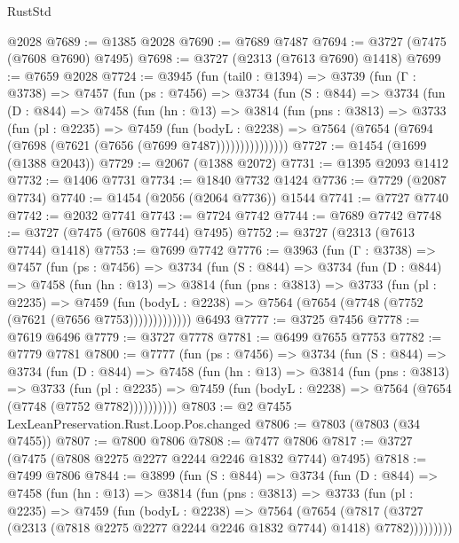 \begin{lexlean}{RustStd}
\begin{coremodule}
    @2028
@7689 := @1385 @2028
@7690 := @7689 @7487
@7694 := @3727 (@7475 (@7608 @7690) @7495)
@7698 := @3727 (@2313 (@7613 @7690) @1418)
@7699 := @7659 @2028
@7724 := @3945
    (fun (tail0 : @1394) =>
    @3739
      (fun (Γ : @3738) =>
      @7457
        (fun (ps : @7456) =>
        @3734
          (fun (S : @844) =>
          @3734
            (fun (D : @844) =>
            @7458
              (fun (hn : @13) =>
              @3814
                (fun (pns : @3813) =>
                @3733
                  (fun (pl : @2235) =>
                  @7459
                    (fun (bodyL : @2238) =>
                    @7564 (@7654 (@7694 (@7698 (@7621 (@7656 (@7699 @7487)))))))))))))))
@7727 := @1454 (@1699 (@1388 @2043))
@7729 := @2067 (@1388 @2072)
@7731 := @1395 @2093 @1412
@7732 := @1406 @7731
@7734 := @1840 @7732 @1424
@7736 := @7729 (@2087 @7734)
@7740 := @1454 (@2056 (@2064 @7736)) @1544
@7741 := @7727 @7740
@7742 := @2032 @7741
@7743 := @7724 @7742
@7744 := @7689 @7742
@7748 := @3727 (@7475 (@7608 @7744) @7495)
@7752 := @3727 (@2313 (@7613 @7744) @1418)
@7753 := @7699 @7742
@7776 := @3963
    (fun (Γ : @3738) =>
    @7457
      (fun (ps : @7456) =>
      @3734
        (fun (S : @844) =>
        @3734
          (fun (D : @844) =>
          @7458
            (fun (hn : @13) =>
            @3814
              (fun (pns : @3813) =>
              @3733
                (fun (pl : @2235) =>
                @7459
                  (fun (bodyL : @2238) =>
                  @7564 (@7654 (@7748 (@7752 (@7621 (@7656 @7753)))))))))))))
    @6493
@7777 := @3725 @7456
@7778 := @7619 @6496
@7779 := @3727 @7778
@7781 := @6499 @7655 @7753
@7782 := @7779 @7781
@7800 := @7777
    (fun (ps : @7456) =>
    @3734
      (fun (S : @844) =>
      @3734
        (fun (D : @844) =>
        @7458
          (fun (hn : @13) =>
          @3814
            (fun (pns : @3813) =>
            @3733
              (fun (pl : @2235) =>
              @7459 (fun (bodyL : @2238) => @7564 (@7654 (@7748 (@7752 @7782))))))))))
@7803 := @2 @7455 LexLeanPreservation.Rust.Loop.Pos.changed
@7806 := @7803 (@7803 (@34 @7455))
@7807 := @7800 @7806
@7808 := @7477 @7806
@7817 := @3727 (@7475 (@7808 @2275 @2277 @2244 @2246 @1832 @7744) @7495)
@7818 := @7499 @7806
@7844 := @3899
    (fun (S : @844) =>
    @3734
      (fun (D : @844) =>
      @7458
        (fun (hn : @13) =>
        @3814
          (fun (pns : @3813) =>
          @3733
            (fun (pl : @2235) =>
            @7459
              (fun (bodyL : @2238) =>
              @7564
                (@7654
                  (@7817
                    (@3727 (@2313 (@7818 @2275 @2277 @2244 @2246 @1832 @7744) @1418) @7782)))))))))

\end{coremodule}
\end{lexlean}
